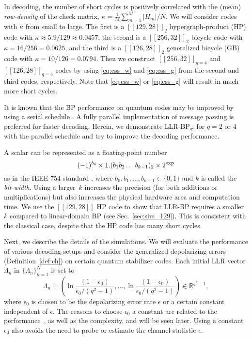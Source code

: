 \documentclass{ieeeaccess}
\newcommand{\RR}{{\mathbb R}}
\let\emph\textit
\theoremstyle{definition}		%
\begin{document}
In decoding, the number of short cycles is positively correlated with the (mean) \emph{row-density} of the check matrix,
$ \kappa = \frac{1}{M}\sum_{m=1}^M |H_m|/N $. 
We will consider codes with $\kappa$ from small to large. 
The first is a $[[129,28]]_2$ hypergraph-product (HP) code with $\kappa \approx 5.9/129 \approx 0.0457$, 
the second is a $[[256,32]]_2$ bicycle code with $\kappa = 16/256 = 0.0625$, 
and the third is a $[[126,28]]_2$ generalized bicycle (GB) code with $\kappa = 10/126 = 0.0794$.
%
Then we construct $[[256,32]]_{q=4}$ and $[[126,28]]_{q=4}$ codes by using \eqref{eq:css_w} and \eqref{eq:css_g} from the second and third codes, respectively.
Note that \eqref{eq:css_w} or \eqref{eq:css_g} will result in much more short cycles.


It is known that the BP performance on quantum codes may be improved by using a serial schedule \cite{KL20,RV20,KCL21}. 
A fully parallel implementation of message passing is preferred for faster decoding. 
%
Herein, we demonstrate \mbox{LLR-BP$_{q^2}$} for $q=2$ or $4$ with the parallel schedule and try to improve the decoding performance.


A scalar can be represented as a floating-point number $$(-1)^{b_0}\times 1.(b_1b_2\dots b_{k-1})_2 \times 2^{\rm exp}$$
as in the IEEE 754 standard \cite{IEEE754}, where $b_0,b_1,\dots,b_{k-1}\in\{0,1\}$ 
and $k$ is called the \emph{bit-width}.
%
Using a larger~$k$ increases the precision (for both additions or multiplications) but also increases the physical hardware area and computation time.
%
We use the  $[[129,28]]$ HP code to show that LLR-BP requires a smaller $k$ compared to linear-domain BP (see Sec.~\ref{sec:sim_129}).
This is consistent with the classical case, despite that the HP code has many short cycles.


Next, we describe the details of the simulations.
We will evaluate the performance of various decoding setups and consider the generalized depolarizing errors (Definition~\ref{def:ch}) on certain quantum stabilizer codes. 
%
Each initial LLR vector $\Lambda_n$ in $\{\Lambda_n\}_{n=1}^N$  is  set to 
	\begin{equation} \label{eq:init}
	\textstyle \Lambda_n = \left( \ln\frac{(1-\epsilon_0)}{\epsilon_0/(q^2-1)}, \dots,\ln\frac{(1-\epsilon_0)}{\epsilon_0/(q^2-1)} \right) \in \RR^{q^2-1},
	\end{equation}
where $\epsilon_0$ is chosen to be the depolarizing error rate $\epsilon$ or a certain constant independent of $\epsilon$. %
The reasons to choose $\epsilon_0$ a constant are related to the performance~\cite{HFI12}, as well as the complexity, and will be seen later.  
Using a constant $\epsilon_0$ also avoids the need to probe or estimate the channel statistic $\epsilon$.
\end{document}
